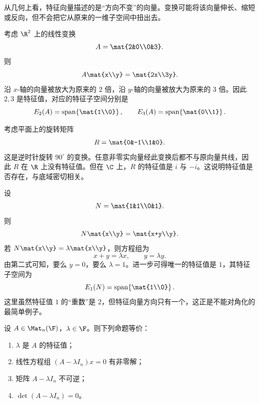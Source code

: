 从几何上看，特征向量描述的是“方向不变”的向量。变换可能将该向量伸长、缩短或反向，但不会把它从原来的一维子空间中扭出去。

\begin{example}
考虑 \(\R^2\) 上的线性变换
\[
A=\mat{2&0\\0&3}.
\]
则
\[
A\mat{x\\y}=\mat{2x\\3y}.
\]
沿 \(x\)-轴的向量被放大为原来的 \(2\) 倍，沿 \(y\)-轴的向量被放大为原来的 \(3\) 倍。因此 \(2,3\) 是特征值，对应的特征子空间分别是
\[
E_2(A)=\operatorname{span}\!\left\{\mat{1\\0}\right\},\qquad E_3(A)=\operatorname{span}\!\left\{\mat{0\\1}\right\}.
\]
\end{example}

\begin{example}
考虑平面上的旋转矩阵
\[
R=\mat{0&-1\\1&0}.
\]
这是逆时针旋转 \(90^\circ\) 的变换。任意非零实向量经此变换后都不与原向量共线，因此 \(R\) 在 \(\R\) 上没有特征值。但在 \(\C\) 上，\(R\) 的特征值是 \(i\) 与 \(-i\)。这说明特征值是否存在，与底域密切相关。
\end{example}

\begin{example}
设
\[
N=\mat{1&1\\0&1}.
\]
则
\[
N\mat{x\\y}=\mat{x+y\\y}.
\]
若 \(N\mat{x\\y}=\lambda\mat{x\\y}\)，则方程组为
\[
x+y=\lambda x,\qquad y=\lambda y.
\]
由第二式可知，要么 \(y=0\)，要么 \(\lambda=1\)。进一步可得唯一的特征值是 \(1\)，其特征子空间为
\[
E_1(N)=\operatorname{span}\!\left\{\mat{1\\0}\right\}.
\]
这里虽然特征值 \(1\) 的“重数”是 \(2\)，但特征向量方向只有一个，这正是不能对角化的最简单例子。
\end{example}

\begin{proposition}\label{prop:eigenvalue-det-criterion}
设 \(A\in \Mat_n(\F)\)，\(\lambda\in \F\)。则下列命题等价：
\begin{enumerate}[label=(\arabic*), leftmargin=2.4em]
  \item \(\lambda\) 是 \(A\) 的特征值；
  \item 线性方程组 \((A-\lambda I_n)x=0\) 有非零解；
  \item 矩阵 \(A-\lambda I_n\) 不可逆；
  \item \(\det(A-\lambda I_n)=0\)。
\end{enumerate}
\end{proposition}

